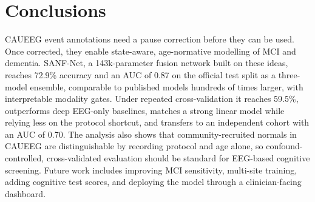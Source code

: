 \section{Conclusions}

CAUEEG event annotations need a pause correction before they can be used. Once corrected, they enable
state-aware, age-normative modelling of MCI and dementia. SANF-Net, a 143k-parameter fusion network built on
these ideas, reaches 72.9\% accuracy and an AUC of 0.87 on the official test split as a three-model ensemble,
comparable to published models hundreds of times larger, with interpretable modality gates. Under repeated
cross-validation it reaches 59.5\%, outperforms deep EEG-only baselines, matches a strong linear model while
relying less on the protocol shortcut, and transfers to an independent cohort with an AUC of 0.70. The analysis
also shows that community-recruited normals in CAUEEG are distinguishable by recording protocol and age alone,
so confound-controlled, cross-validated evaluation should be standard for EEG-based cognitive screening.
Future work includes improving MCI sensitivity, multi-site training, adding cognitive test scores, and
deploying the model through a clinician-facing dashboard.
